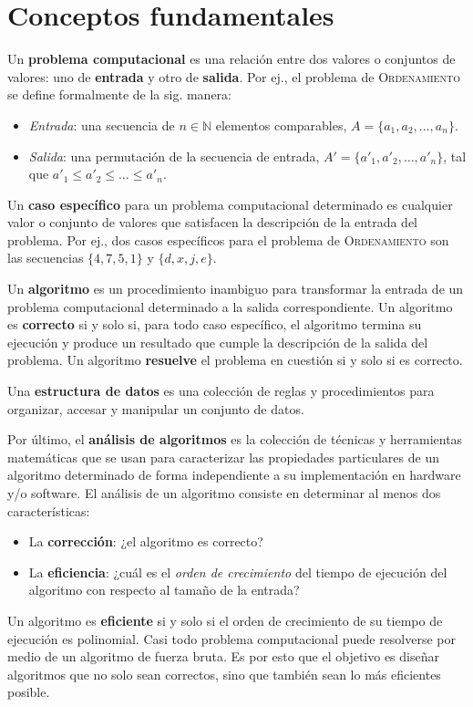 \chapter{Conceptos fundamentales}

Un \textbf{problema computacional} es una relación entre dos valores o conjuntos de valores: uno de \textbf{entrada} y otro de \textbf{salida}. 
Por ej., el problema de \textsc{Ordenamiento} se define formalmente de la sig. manera:
\begin{itemize}
  \item \emph{Entrada}: una secuencia de \(n\in\mathbb{N}\) elementos comparables, \(A=\{a_1,a_2,\dots,a_n\}\).
  \item \emph{Salida}: una permutación de la secuencia de entrada, \(A'=\{a'_1,a'_2,\dots,a'_n\}\), tal que \(a'_1\leq a'_2\leq\dots\leq a'_n\).
\end{itemize}
Un \textbf{caso específico} para un problema computacional determinado es cualquier valor o conjunto de valores que satisfacen la descripción de la entrada del problema.
Por ej., dos casos específicos para el problema de \textsc{Ordenamiento} son las secuencias \(\{4,7,5,1\}\) y \(\{d,x,j,e\}\).

Un \textbf{algoritmo} es un procedimiento inambiguo para transformar la entrada de un problema computacional determinado a la salida correspondiente.
Un algoritmo es \textbf{correcto} si y solo si, para todo caso específico, el algoritmo termina su ejecución y produce un resultado que cumple la descripción de la salida del problema.
Un algoritmo \textbf{resuelve} el problema en cuestión si y solo si es correcto.

Una \textbf{estructura de datos} es una colección de reglas y procedimientos para organizar, accesar y manipular un conjunto de datos.

Por último, el \textbf{análisis de algoritmos} es la colección de técnicas y herramientas matemáticas que se usan para caracterizar las propiedades particulares de un algoritmo determinado de forma independiente a su implementación en hardware y/o software. 
El análisis de un algoritmo consiste en determinar al menos dos características:
\begin{itemize}
  \item La \textbf{corrección}: ¿el algoritmo es correcto?
  \item La \textbf{eficiencia}: ¿cuál es el \emph{orden de crecimiento} del 
  tiempo de ejecución del algoritmo con respecto al tamaño de la entrada?
\end{itemize}
Un algoritmo es \textbf{eficiente} si y solo si el orden de crecimiento
de su tiempo de ejecución es polinomial.
Casi todo problema computacional puede resolverse por medio de un algoritmo de fuerza bruta.
Es por esto que el objetivo es diseñar algoritmos que no solo sean correctos, sino que también sean lo más eficientes posible.

